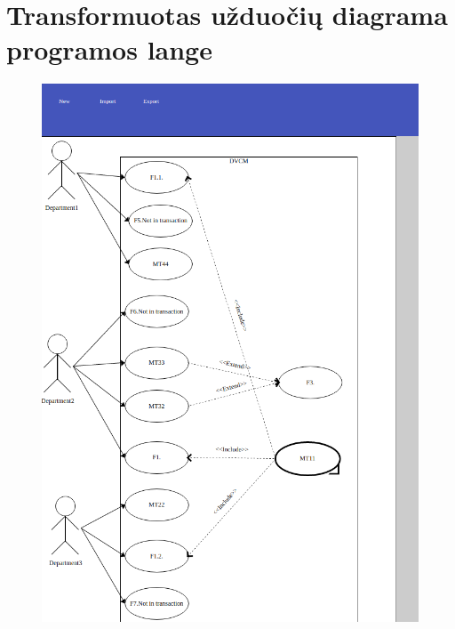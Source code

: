 \documentclass{VUMIFInfBakalaurinis}
\begin{document}
\section{Transformuotas užduočių diagrama programos lange} \label{appendix:use_cases_window}
\begin{figure}[H]
    \centering
    \includegraphics[scale=0.6]{img/use_cases_window}
\end{figure}

\end{document}
